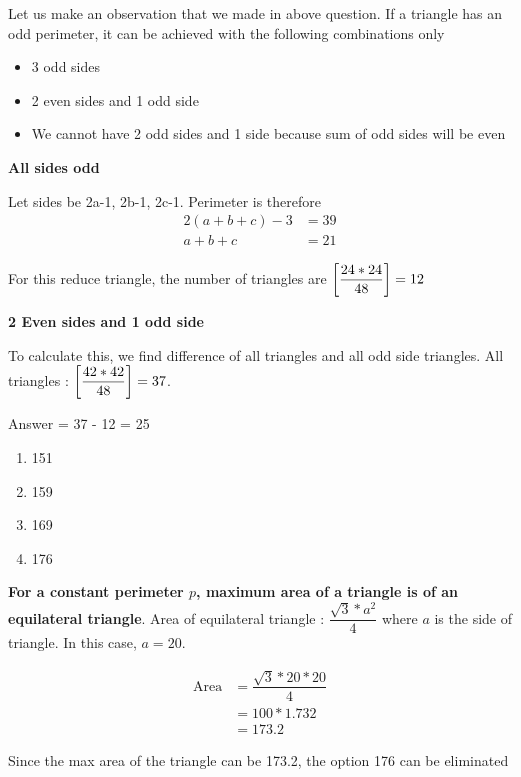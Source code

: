 Let us make an observation that we made in above question. If a triangle has an odd perimeter, it can be achieved with the following combinations only
\begin{itemize}
    \item 3 odd sides
    \item 2 even sides and 1 odd side
    \item We cannot have 2 odd sides and 1 side because sum of odd sides will be even
\end{itemize}

\textbf{All sides odd}

Let sides be 2a-1, 2b-1, 2c-1. Perimeter is therefore
\begin{align*}
    2 (a + b + c) - 3 &= 39 \\
    a + b  + c &= 21
\end{align*}

For this reduce triangle, the number of triangles are $\left [ \dfrac{24 * 24}{48} \right ] = 12$

\textbf{2 Even sides and 1 odd side}

To calculate this, we find difference of all triangles and all odd side triangles. All triangles : $\left [ \dfrac{42 * 42}{48} \right ] = 37$. 

Answer = 37 - 12 = 25

\begin{enumerate}
    \item 151
    \item 159
    \item 169
    \item 176
\end{enumerate}

\textbf{For a constant perimeter $p$, maximum area of a triangle is of an equilateral triangle}. Area of equilateral triangle : $\dfrac{\sqrt{3} * a^2}{4}$ where $a$ is the side of triangle. In this case, $a = 20$. 

\begin{align*}
    \text{Area} &= \dfrac{\sqrt{3} * 20 * 20}{4} \\
    &=  100 * 1.732 \\
    &= 173.2
\end{align*}

Since the max area of the triangle can be 173.2, the option 176 can be eliminated

\newpage


















